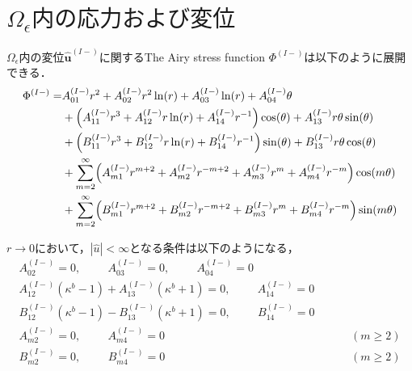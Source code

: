 \section{$\Omega_{\epsilon}内の応力および変位$}

$\Omega_\epsilon$内の変位$\hat{\bm{u}}^{(I-)}$に関するThe Airy stress function $\Phi^{(I-)}$は以下のように展開できる．
\begin{align}
\Phi^{(I-)} =&A_{01}^{(I-)}r^2+A_{02}^{(I-)}r^2\ln(r)+A_{03}^{(I-)}\ln(r)+A_{04}^{(I-)}\theta
\nonumber
\\
&+\Bigl(A_{11}^{(I-)}r^3+A_{12}^{(I-)}r\ln(r)+A_{14}^{(I-)}r^{-1}\Bigr)\cos(\theta)+A_{13}^{(I-)}r\theta \sin(\theta)
\nonumber
\\
&+\Bigl(B_{11}^{(I-)}r^3+B_{12}^{(I-)}r\ln(r)+B_{14}^{(I-)}r^{-1}\Bigr)\sin(\theta)+B_{13}^{(I-)}r\theta \cos(\theta)
\nonumber
\\
&+\sum_{m=2}^{\infty}\Bigl(A_{m1}^{(I-)}r^{m+2}+A_{m2}^{(I-)}r^{-m+2}
+A_{m3}^{(I-)}r^{m}+A_{m4}^{(I-)}r^{-m}\Bigr)\cos(m\theta)
\nonumber
\\
&+\sum_{m=2}^{\infty}\Bigl(B_{m1}^{(I-)}r^{m+2}+B_{m2}^{(I-)}r^{-m+2}
+B_{m3}^{(I-)}r^{m}+B_{m4}^{(I-)}r^{-m}\Bigr)\sin(m\theta)
\label{eq:AiryIn1}
\end{align}



$r\rightarrow0$において，$|\hat{u}|<\infty$となる条件は以下のようになる，
\begin{align}
A_{02}^{(I-)}=0,\hspace{1cm}A_{03}^{(I-)}=0,\hspace{1cm}A_{04}^{(I-)}=0&
\nonumber
\\
A_{12}^{(I-)}(\kappa^{b}-1)+A_{13}^{(I-)}(\kappa^{b}+1)=0,\hspace{1cm}A_{14}^{(I-)}=0&
\nonumber
\\
B_{12}^{(I-)}(\kappa^{b}-1)-B_{13}^{(I-)}(\kappa^{b}+1)=0,\hspace{1cm}B_{14}^{(I-)}=0&
\nonumber
\\
A_{m2}^{(I-)}=0,\hspace{1cm}A_{m4}^{(I-)}=0&\hspace{1cm}(m\geq2)
\nonumber
\\
B_{m2}^{(I-)}=0,\hspace{1cm}B_{m4}^{(I-)}=0&\hspace{1cm}(m\geq2)
\label{eq:ConIn1}
\end{align}


